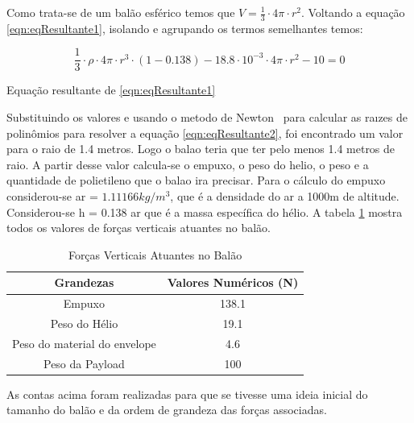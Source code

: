 	Como trata-se de um balão esférico temos que $V = \frac{1}{3} \cdot 4 \pi \cdot r^2$. Voltando a equação \eqref{eqn:eqResultante1}, isolando e agrupando os termos semelhantes temos:

	\begin{equacao}
		\begin{equation}
			\frac{1}{3} \cdot \rho \cdot 4 \pi \cdot r^3 \cdot (1 - 0.138) - 18.8 \cdot 10^{-3} \cdot 4 \pi \cdot r^2 - 10 = 0
		\end{equation}
		\caption{Equação resultante de \eqref{eqn:eqResultante1}}
		\label{eqn:eqResultante2}
	\end{equacao}

	Substituindo os valores e usando o metodo de Newton~\cite[pp.~174--175]{hoffman} para calcular as raızes de polinômios para resolver a equação \eqref{eqn:eqResultante2}, foi encontrado um valor para o raio de 1.4 metros. Logo o balao teria que ter pelo menos 1.4 metros de raio. A partir desse valor calcula-se o empuxo, o peso do helio, o peso e a quantidade de polietileno que o balao ira precisar. Para o cálculo do empuxo considerou-se ar  = $1.11166 kg/m^3$, que é a densidade do ar a 1000m de altitude. Considerou-se h = 0.138 ar que é a massa específica do hélio. A tabela \ref{tab:forcasVerticaisAtuantes} mostra todos os valores de forças verticais atuantes no balão.

	\begin{table}[H]
		\centering
		\begin{tabular}{|c|c|}
			\hline
			\rowcolor[HTML]{FFFFFF}
			{\color[HTML]{000000} \textbf{Grandezas}} & {\color[HTML]{000000} \textbf{Valores Numéricos (N)}} \\ \hline
			Empuxo                                    & 138.1                                                 \\ \hline
			Peso do Hélio                             & 19.1                                                  \\ \hline
			Peso do material do envelope              & 4.6                                                   \\ \hline
			Peso da Payload                           & 100                                                   \\ \hline
		\end{tabular}
		\caption{Forças Verticais Atuantes no Balão}
		\label{tab:forcasVerticaisAtuantes}
	\end{table}

	As contas acima foram realizadas para que se tivesse uma ideia inicial do tamanho do balão e da ordem de grandeza das forças associadas.


